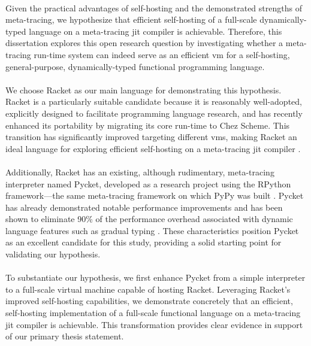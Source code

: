         \paragraph{}%
            Given the practical advantages of self-hosting and the demonstrated strengths of meta-tracing, we hypothesize that efficient self-hosting of a full-scale dynamically-typed language on a meta-tracing \gls{jit} compiler is achievable. Therefore, this dissertation explores this open research question by investigating whether a meta-tracing run-time system can indeed serve as an efficient \gls{vm} for a self-hosting, general-purpose, dynamically-typed functional programming language.

        \paragraph{}%
            We choose Racket as our main language for demonstrating this hypothesis. Racket is a particularly suitable candidate because it is reasonably well-adopted, explicitly designed to facilitate programming language research, and has recently enhanced its portability by migrating its core run-time to Chez Scheme. This transition has significantly improved targeting different \glspl{vm}, making Racket an ideal language for exploring efficient self-hosting on a meta-tracing \gls{jit} compiler \cite{icfp2019}.

        \paragraph{}%
            Additionally, Racket has an existing, although rudimentary, meta-tracing interpreter named Pycket, developed as a research project using the RPython framework—the same meta-tracing framework on which PyPy was built \cite{bolzPhDThesis,bolzMetatracingMakesFast2014}. Pycket has already demonstrated notable performance improvements and has been shown to eliminate 90\% of the performance overhead associated with dynamic language features such as gradual typing \cite{pycketmain,pycketmain2}. These characteristics position Pycket as an excellent candidate for this study, providing a solid starting point for validating our hypothesis.

        \paragraph{}%
            To substantiate our hypothesis, we first enhance Pycket from a simple interpreter to a full-scale virtual machine capable of hosting Racket. Leveraging Racket's improved self-hosting capabilities, we demonstrate concretely that an efficient, self-hosting implementation of a full-scale functional language on a meta-tracing \gls{jit} compiler is achievable. This transformation provides clear evidence in support of our primary thesis statement.

